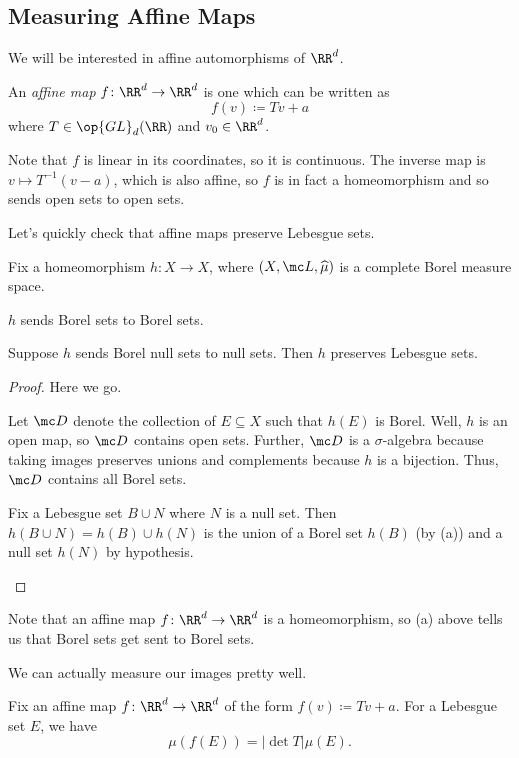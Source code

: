 \documentclass[../notes.tex]{subfiles}
\begin{document}
\subsection{Measuring Affine Maps}
We will be interested in affine automorphisms of $\RR^d$.
\begin{definition}[affine]
	An \textit{affine map} $f\colon\RR^d\to\RR^d$ is one which can be written as
	\[f(v)\coloneqq Tv+a\]
	where $T\in\op{GL}_d(\RR)$ and $v_0\in\RR^d$.
\end{definition}
\begin{remark}
	Note that $f$ is linear in its coordinates, so it is continuous. The inverse map is $v\mapsto T^{-1}(v-a)$, which is also affine, so $f$ is in fact a homeomorphism and so sends open sets to open sets.
\end{remark}
Let's quickly check that affine maps preserve Lebesgue sets.
\begin{lemma} \label{lem:preserve-leb}
	Fix a homeomorphism $h\colon X\to X$, where $(X,\mc L,\widehat\mu)$ is a complete Borel measure space.
	\begin{listalph}
		\item $h$ sends Borel sets to Borel sets.
		\item Suppose $h$ sends Borel null sets to null sets. Then $h$ preserves Lebesgue sets.
	\end{listalph}
\end{lemma}
\begin{proof}
	Here we go.
	\begin{listalph}
		\item Let $\mc D$ denote the collection of $E\subseteq X$ such that $h(E)$ is Borel. Well, $h$ is an open map, so $\mc D$ contains open sets. Further, $\mc D$ is a $\sigma$-algebra because taking images preserves unions and complements because $h$ is a bijection. Thus, $\mc D$ contains all Borel sets.
		\item Fix a Lebesgue set $B\cup N$ where $N$ is a null set. Then $h(B\cup N)=h(B)\cup h(N)$ is the union of a Borel set $h(B)$ (by (a)) and a null set $h(N)$ by hypothesis.
		\qedhere
	\end{listalph}
\end{proof}
\begin{remark}
	Note that an affine map $f\colon\RR^d\to\RR^d$ is a homeomorphism, so (a) above tells us that Borel sets get sent to Borel sets.
\end{remark}
We can actually measure our images pretty well.
\begin{proposition}
	Fix an affine map $f\colon\RR^d\to\RR^d$ of the form $f(v)\coloneqq Tv+a$. For a Lebesgue set $E$, we have
	\[\mu(f(E))=\left|\det T\right|\mu(E).\]
\end{proposition}
\end{document}
